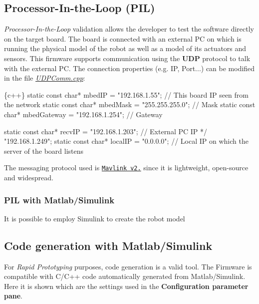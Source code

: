 \subsection*{Processor-\/\+In-\/the-\/\+Loop (P\+IL)}

{\itshape Processor-\/\+In-\/the-\/\+Loop} validation allows the developer to test the software directly on the target board. The board is connected with an external PC on which is running the physical model of the robot as well as a model of its actuators and sensors. This firmware supports communication using the {\bfseries U\+DP} protocol to talk with the external PC. The connection properties (e.\+g. IP, Port...) can be modified in the file {\itshape \hyperlink{UDPComm_8cpp}{U\+D\+P\+Comm.\+cpp}}\+: 
\begin{DoxyCode}
\{c++\}
static const char*          mbedIP       = "192.168.1.55";      // This board IP seen from the network
static const char*          mbedMask     = "255.255.255.0";     // Mask
static const char*          mbedGateway  = "192.168.1.254";     // Gateway

static const char*          recvIP = "192.168.1.203";           // External PC IP */ "192.168.1.249";
static const char*          localIP = "0.0.0.0";                // Local IP on which the server of the
       board listens
\end{DoxyCode}
 The messaging protocol used is \href{https://mavlink.io/en/}{\tt Mavlink v2.} since it is lightweight, open-\/source and widespread. \subsubsection*{P\+IL with Matlab/\+Simulink\textregistered{}}

It is possible to employ Simulink to create the robot model

\subsection*{Code generation with Matlab/\+Simulink\textregistered{}}

For {\itshape Rapid Prototyping} purposes, code generation is a valid tool. The Firmware is compatible with C/\+C++ code automatically generated from Matlab/\+Simulink\textregistered{}. Here it is shown which are the settings used in the {\bfseries Configuration parameter pane}. 